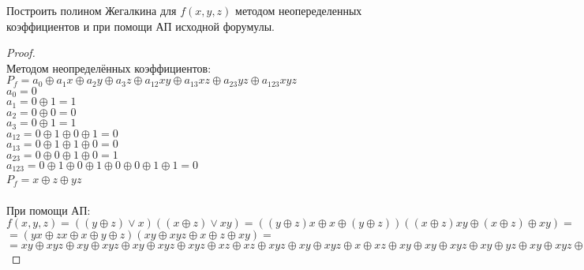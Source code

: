 \begin{problem}
Построить полином Жегалкина для $f(x, y, z)$ методом неопеределенных коэффициентов и при помощи АП исходной форумулы.
\end{problem}
\begin{proof} $ $\\
    Методом неопределённых коэффициентов:
    $P_f = a_0 \oplus a_1x \oplus a_2y \oplus a_3z \oplus a_{12}xy \oplus a_{13}xz \oplus a_{23}yz \oplus a_{123}xyz$\\
    $a_0 = 0$\\
    $a_1 = 0 \oplus 1 = 1$\\
    $a_2 = 0 \oplus 0 = 0$\\
    $a_3 = 0 \oplus 1 = 1$\\
    $a_{12} = 0 \oplus 1 \oplus 0 \oplus 1 = 0$\\
    $a_{13} = 0 \oplus 1 \oplus 1 \oplus 0 = 0$\\
    $a_{23} = 0 \oplus 0 \oplus 1 \oplus 0 = 1$\\
    $a_{123} = 0 \oplus 1 \oplus 0 \oplus 1 \oplus 0 \oplus 0 \oplus 1 \oplus 1 = 0$\\
    $P_f = x \oplus z \oplus yz$
    $ $\\\\
    При помощи АП:\\
    $f(x, y, z) = ((y \oplus z) \vee x)((x \oplus z) \vee xy) = 
    ((y \oplus z)x \oplus x \oplus (y \oplus z))((x \oplus z)xy \oplus (x \oplus z) \oplus xy) =$\\ 
    $= (yx \oplus zx \oplus x \oplus y \oplus z)(xy \oplus xyz \oplus x \oplus z \oplus xy) =$\\
    $= xy \oplus xyz \oplus xy \oplus xyz \oplus xy \oplus xyz \oplus xyz \oplus xz \oplus xz \oplus xyz \oplus xy \oplus xyz \oplus x \oplus xz \oplus xy \oplus xy \oplus xyz \oplus xy \oplus yz \oplus xy \oplus xyz \oplus xyz \oplus xz \oplus z \oplus xyz = x \oplus z \oplus yz$
\end{proof}

